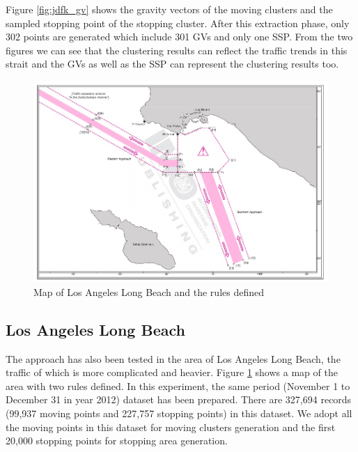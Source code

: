 \documentclass[12pt,glossary]{dalcsthesis}
\begin{document}
Figure \ref{fig:jdfk_gv} shows the gravity vectors of the moving clusters and the sampled stopping point of the stopping cluster. After this extraction phase, only 302 points are generated which include 301 GVs and only one SSP. From the two figures we can see that the clustering results can reflect the traffic trends in this strait and the GVs as well as the SSP can represent the clustering results too.

\begin{figure}[!htb]
\centering
\includegraphics[width=4.6in]{la_pic.png}
\caption{Map of Los Angeles Long Beach and the rules defined \cite{anabook}}
\label{fig:la_pic}
\end{figure}

\subsection{Los Angeles Long Beach}
\label{sec:exp_1.2}
The approach has also been tested in the area of Los Angeles Long Beach, the traffic of which is more complicated and heavier. Figure \ref{fig:la_pic} shows a map of the area with two rules defined. In this experiment, the same period (November 1 to December 31 in year 2012) dataset has been prepared. There are 327,694 records (99,937 moving points and 227,757 stopping points) in this dataset. We adopt all the moving points in this dataset for moving clusters generation and the first 20,000 stopping points for stopping area generation.
\end{document}

